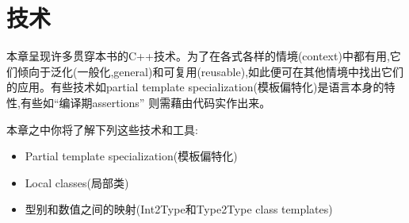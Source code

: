 \documentclass[math,code,12pt]{amznotes}
\begin{document}

\mainmatter{}

\chapter{技术}	
	本章呈现许多贯穿本书的C++技术。为了在各式各样的情境(context)中都有用,它们倾向于泛化(一般化,general)和可复用(reusable),如此便可在其他情境中找出它们的应用。有些技术如partial template specialization(模板偏特化)是语言本身的特性,有些如``编译期assertions'' 则需藉由代码实作出来。	
	
	本章之中你将了解下列这些技术和工具:
	\begin{itemize}
		\item Partial template specialization(模板偏特化)
		\item Local classes(局部类)
		\item 型别和数值之间的映射(Int2Type和Type2Type class templates)
	\end{itemize}
\end{document}
